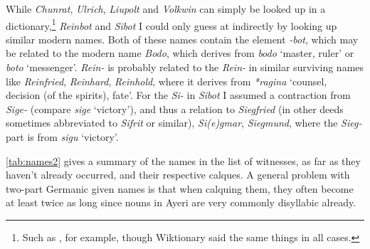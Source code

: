 \documentclass[12pt,paper=a4]{scrartcl}
\newcommand{\fw}[1]{\textit{#1}} %
\begin{document}
While \fw{Chunrat}, \fw{Ulrich}, \fw{Liupolt} and \fw{Volkwin} can simply 
be looked up in a dictionary,\footnote{Such as \textcite{duden:vornamen}, for 
example, though Wiktionary said the same things in all cases.} \fw{Reinbot} and 
\fw{Sibot} I could only guess at indirectly by looking up similar modern names.
Both of these names contain the element \fw{-bot}, which may be related to the 
modern name \fw{Bodo}, which derives from \Os{} \fw{bodo} `master, ruler' or 
\Ohg{} \fw{boto} `messenger'. \fw{Rein-} is probably related to the \fw{Rein-} 
in similar surviving names like \fw{Reinfried}, \fw{Reinhard}, \fw{Reinhold}, 
where it derives from \Gmc{} \fw{*ragina} `counsel, decision (of the spirits), 
fate'. For the \fw{Si-} in \fw{Sibot} I assumed a contraction from \fw{Sige-} 
(compare \Mhg{} \fw{sige} `victory'), and thus a relation to \fw{Siegfried} (in 
other deeds sometimes abbreviated to \fw{Sifrit} or similar), \fw{Si(e)gmar}, 
\fw{Siegmund}, where the \fw{Sieg-} part is from \Ohg{} \fw{sigu} `victory'.

\autoref{tab:names2} gives a summary of the names in the list of witnesses, as 
far as they haven't already occurred, and their respective calques. A general 
problem with two-part Germanic given names is that when calquing them, they 
often become at least twice as long since nouns in Ayeri are very commonly 
disyllabic already.
\end{document}
